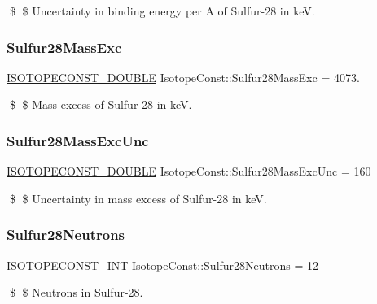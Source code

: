 \$ \$ Uncertainty in binding energy per A of Sulfur-\/28 in keV. \mbox{\label{group___isotope_const-_sulfur-_s28_gad353eefb677ff82a35adb84eee9a59e3}} 
\subsubsection{\texorpdfstring{Sulfur28\+Mass\+Exc}{Sulfur28MassExc}}
{\footnotesize\ttfamily \mbox{\hyperlink{group___isotope_const-_macros_ga8f45a7272ce02c0b4c65c44636ed719a}{I\+S\+O\+T\+O\+P\+E\+C\+O\+N\+S\+T\+\_\+\+D\+O\+U\+B\+LE}} Isotope\+Const\+::\+Sulfur28\+Mass\+Exc = 4073.}

\$ \$ Mass excess of Sulfur-\/28 in keV. \mbox{\label{group___isotope_const-_sulfur-_s28_ga1b950e05c8794e480b83ce8793e4203c}} 
\subsubsection{\texorpdfstring{Sulfur28\+Mass\+Exc\+Unc}{Sulfur28MassExcUnc}}
{\footnotesize\ttfamily \mbox{\hyperlink{group___isotope_const-_macros_ga8f45a7272ce02c0b4c65c44636ed719a}{I\+S\+O\+T\+O\+P\+E\+C\+O\+N\+S\+T\+\_\+\+D\+O\+U\+B\+LE}} Isotope\+Const\+::\+Sulfur28\+Mass\+Exc\+Unc = 160}

\$ \$ Uncertainty in mass excess of Sulfur-\/28 in keV. \mbox{\label{group___isotope_const-_sulfur-_s28_ga624aca0aeed1104bb0bd1b461e12d9da}} 
\subsubsection{\texorpdfstring{Sulfur28\+Neutrons}{Sulfur28Neutrons}}
{\footnotesize\ttfamily \mbox{\hyperlink{group___isotope_const-_macros_ga5f18360b3e99483a35c32d789e62621c}{I\+S\+O\+T\+O\+P\+E\+C\+O\+N\+S\+T\+\_\+\+I\+NT}} Isotope\+Const\+::\+Sulfur28\+Neutrons = 12}

\$ \$ Neutrons in Sulfur-\/28. \mbox{\label{group___isotope_const-_sulfur-_s28_ga5950e4a7212f8f2b72f5a407e020ac45}} 
